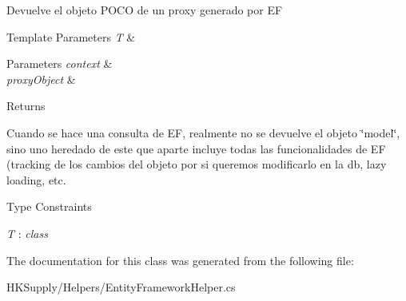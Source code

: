 Devuelve el objeto P\+O\+CO de un proxy generado por EF 


\begin{DoxyTemplParams}{Template Parameters}
{\em T} & \\
\hline
\end{DoxyTemplParams}

\begin{DoxyParams}{Parameters}
{\em context} & \\
\hline
{\em proxy\+Object} & \\
\hline
\end{DoxyParams}
\begin{DoxyReturn}{Returns}

\end{DoxyReturn}


Cuando se hace una consulta de EF, realmente no se devuelve el objeto \char`\"{}model\char`\"{}, sino uno heredado de este que aparte incluye todas las funcionalidades de EF (tracking de los cambios del objeto por si queremos modificarlo en la db, lazy loading, etc. \begin{Desc}
\item[Type Constraints]\begin{description}
\item[{\em T} : {\em class}]\end{description}
\end{Desc}


The documentation for this class was generated from the following file\+:\begin{DoxyCompactItemize}
\item 
H\+K\+Supply/\+Helpers/Entity\+Framework\+Helper.\+cs\end{DoxyCompactItemize}
